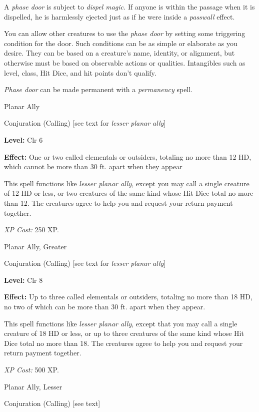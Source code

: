 \documentclass{article}
\begin{document}
A \textit{phase door }is subject to \textit{dispel magic. }If anyone is within 
the passage when it is dispelled, he is harmlessly ejected just as if he were inside 
a \textit{passwall }effect.

You can allow other creatures to use the \textit{phase door }by setting some triggering 
condition for the door. Such conditions can be as simple or elaborate as you desire. 
They can be based on a creature's name, identity, or alignment, but otherwise must 
be based on observable actions or qualities. Intangibles such as level, class, 
Hit Dice, and hit points don't qualify.

\textit{Phase door }can be made permanent with a \textit{permanency }spell.

\vspace{12pt}
Planar Ally

Conjuration (Calling) [see text for \textit{lesser planar ally}]

\textbf{Level:} Clr 6

\textbf{Effect:} One or two called elementals or outsiders, totaling no more than 
12 HD, which cannot be more than 30 ft. apart when they appear

This spell functions like \textit{lesser planar ally}, except you may call a single 
creature of 12 HD or less, or two creatures of the same kind whose Hit Dice total 
no more than 12. The creatures agree to help you and request your return payment 
together.

\textit{XP Cost: }250 XP.

\vspace{12pt}
Planar Ally, Greater

Conjuration (Calling) [see text for \textit{lesser planar ally}]

\textbf{Level:} Clr 8

\textbf{Effect:} Up to three called elementals or outsiders, totaling no more than 
18 HD, no two of which can be more than 30 ft. apart when they appear.

This spell functions like \textit{lesser planar ally}, except that you may call 
a single creature of 18 HD or less, or up to three creatures of the same kind whose 
Hit Dice total no more than 18. The creatures agree to help you and request your 
return payment together.

\textit{XP Cost: }500 XP.

\vspace{12pt}
Planar Ally, Lesser

Conjuration (Calling) [see text]
\end{document}
